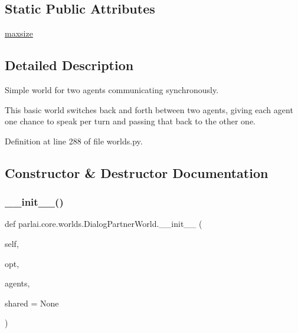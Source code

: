 \subsection*{Static Public Attributes}
\begin{DoxyCompactItemize}
\item 
\hyperlink{classparlai_1_1core_1_1worlds_1_1DialogPartnerWorld_acae28d33fb7d494b7df84d0f8c57eb23}{maxsize}
\end{DoxyCompactItemize}


\subsection{Detailed Description}
\begin{DoxyVerb}Simple world for two agents communicating synchronously.

This basic world switches back and forth between two agents, giving each agent one
chance to speak per turn and passing that back to the other one.
\end{DoxyVerb}
 

Definition at line 288 of file worlds.\+py.



\subsection{Constructor \& Destructor Documentation}
\mbox{\label{classparlai_1_1core_1_1worlds_1_1DialogPartnerWorld_a21ea86d832ae73e670fcfbaea943e1c0}} 
\subsubsection{\texorpdfstring{\+\_\+\+\_\+init\+\_\+\+\_\+()}{\_\_init\_\_()}}
{\footnotesize\ttfamily def parlai.\+core.\+worlds.\+Dialog\+Partner\+World.\+\_\+\+\_\+init\+\_\+\+\_\+ (\begin{DoxyParamCaption}\item[{}]{self,  }\item[{}]{opt,  }\item[{}]{agents,  }\item[{}]{shared = {\ttfamily None} }\end{DoxyParamCaption})}




